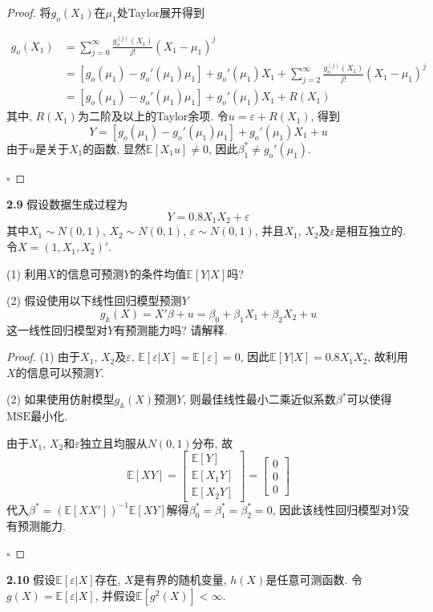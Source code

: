 \documentclass[cn,12pt,math=mtpro2,citestyle=gb7714-2015,bibstyle=gb7714-2015,twocol,mode=simple]{elegantbook}
\newcommand{\E}{\mathbb{E}}
\begin{document}
\begin{proof}
将$g_o(X_1)$在$\mu_1$处Taylor展开得到

\begin{align}
g_o(X_1)&=\sum_{j=0}^{\infty}\frac{g_o^{(j)}(X_1)}{j!}(X_1-\mu_1)^j \nonumber \\
&=[g_o(\mu_1)-g_o'(\mu_1)\mu_1]+g_o'(\mu_1)X_1+\sum_{j=2}^{\infty}\frac{g_o^{(j)}(X_1)}{j!}(X_1-\mu_1)^j \nonumber \\
&=[g_o(\mu_1)-g_o'(\mu_1)\mu_1]+g_o'(\mu_1)X_1+R(X_1) \nonumber
\end{align}
其中, $R(X_1)$为二阶及以上的Taylor余项. 令$u=\varepsilon+R(X_1)$, 得到
$$Y= [g_o(\mu_1)-g_o'(\mu_1)\mu_1]+g_o'(\mu_1)X_1+u$$
由于$u$是关于$X_1$的函数, 显然$\E[X_1u]\neq 0$, 因此$\beta_1^{\ast}\neq g_o'(\mu_1)$.

$\square$
\end{proof}

\textbf{2.9} 假设数据生成过程为
$$Y=0.8X_1X_2+\varepsilon$$
其中$X_1\sim N(0,1)$, $X_2\sim N(0,1)$, $\varepsilon\sim N(0,1)$, 并且$X_1$, $X_2$及$\varepsilon$是相互独立的. 令$X=(1,X_1,X_2)'$.

(1) 利用$X$的信息可预测$Y$的条件均值$\E[Y|X]$吗?

(2) 假设使用以下线性回归模型预测$Y$
$$g_{\mathbb{A}}(X)=X'\beta+u=\beta_0+\beta_1X_1+\beta_2X_2+u$$
这一线性回归模型对$Y$有预测能力吗? 请解释.

\begin{proof}
  (1) 由于$X_1$, $X_2$及$\varepsilon$, $\E[\varepsilon|X]=\E[\varepsilon]=0$, 因此$\E[Y|X]=0.8X_1X_2$, 故利用$X$的信息可以预测$Y$.

  (2) 如果使用仿射模型$g_{\mathbb{A}}(X)$预测$Y$, 则最佳线性最小二乘近似系数$\beta^{\ast}$可以使得$\text{MSE}$最小化.

  由于$X_1$, $X_2$和$\varepsilon$独立且均服从$N(0,1)$分布, 故 $$\E[XY]=\begin{bmatrix}
\E[Y]  \\
\E[X_1Y] \\
\E[X_2Y]
\end{bmatrix}=\begin{bmatrix}
0 \\
0 \\
0
\end{bmatrix}$$
代入$\beta^{\ast}=(\E[XX'])^{-1}\E[XY]$解得$\beta_0^{\ast}=\beta_1^{\ast}=\beta_2^{\ast}=0$, 因此该线性回归模型对$Y$没有预测能力.

$\square$
\end{proof}

\textbf{2.10} 假设$\E[\varepsilon|X]$存在, $X$是有界的随机变量, $h(X)$是任意可测函数. 令$g(X)=\E[\varepsilon|X]$, 并假设$\E[g^2(X)]<\infty$.
\end{document}
